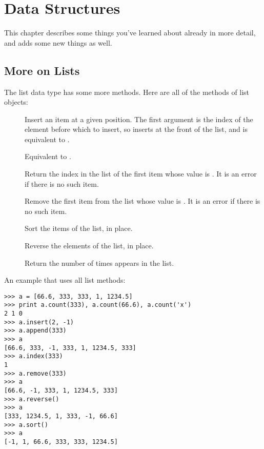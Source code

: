 \documentclass{manual}
\begin{document}
\chapter{Data Structures}
\label{structures}

This chapter describes some things you've learned about already in
more detail, and adds some new things as well.

\section{More on Lists}
\label{moreLists}

The list data type has some more methods.  Here are all of the methods
of list objects:

\begin{description}

\item[]
Insert an item at a given position.  The first argument is the index of
the element before which to insert, so  inserts at
the front of the list, and  is equivalent to
.

\item[]
Equivalent to .

\item[]
Return the index in the list of the first item whose value is .
It is an error if there is no such item.

\item[]
Remove the first item from the list whose value is .
It is an error if there is no such item.

\item[]
Sort the items of the list, in place.

\item[]
Reverse the elements of the list, in place.

\item[]
Return the number of times  appears in the list.

\end{description}

An example that uses all list methods:

\begin{verbatim}
>>> a = [66.6, 333, 333, 1, 1234.5]
>>> print a.count(333), a.count(66.6), a.count('x')
2 1 0
>>> a.insert(2, -1)
>>> a.append(333)
>>> a
[66.6, 333, -1, 333, 1, 1234.5, 333]
>>> a.index(333)
1
>>> a.remove(333)
>>> a
[66.6, -1, 333, 1, 1234.5, 333]
>>> a.reverse()
>>> a
[333, 1234.5, 1, 333, -1, 66.6]
>>> a.sort()
>>> a
[-1, 1, 66.6, 333, 333, 1234.5]
\end{verbatim}
\end{document}

